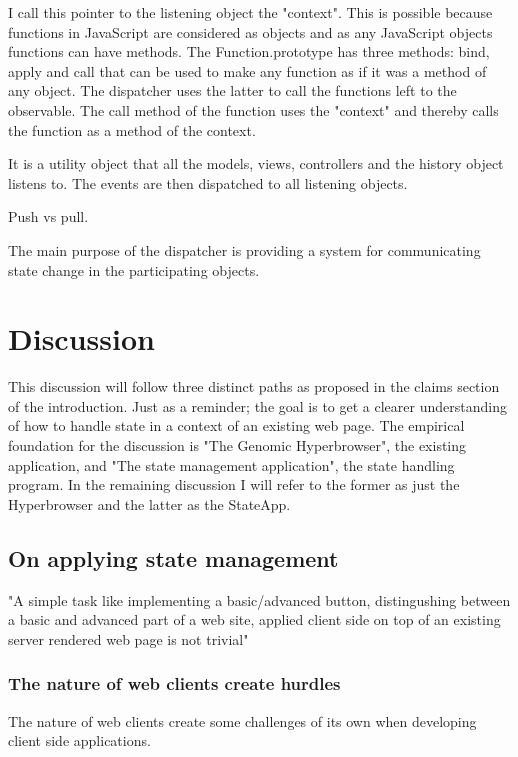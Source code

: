 \documentclass[english]{ifimaster}
\begin{document}
I call this pointer to the listening object the "context". This is possible because functions in JavaScript are considered as objects and as any JavaScript objects functions can have methods.
The Function.prototype has three methods: bind, apply and call that can be used to make any function as if it was a method of any object. The dispatcher uses the latter to call the functions left to the observable. The call method of the function uses the "context" and thereby calls the function as a method of the context.

It is a utility object that all the models, views, controllers and the history object listens to. The events are then dispatched to all listening objects. 

Push vs pull.

The main purpose of the dispatcher is providing a system for communicating state change in the participating objects.  

\part{Discussion}

This discussion will follow three distinct paths as proposed in the claims section of the introduction. Just as a reminder; the goal is to get a clearer understanding of how to handle state in a context of an existing web page. The empirical foundation for the discussion is "The Genomic Hyperbrowser", the existing application, and "The state management application", the state handling program. In the remaining discussion I will refer to the former as just the Hyperbrowser and the latter as the StateApp.

\chapter{On applying state management}

"A simple task like implementing a basic/advanced button, distingushing between a basic and advanced part of a web site, applied client side on top of an existing server rendered web page is not trivial"
\section{The nature of web clients create hurdles}
The nature of web clients create some challenges of its own when developing client side applications. 
\end{document}
